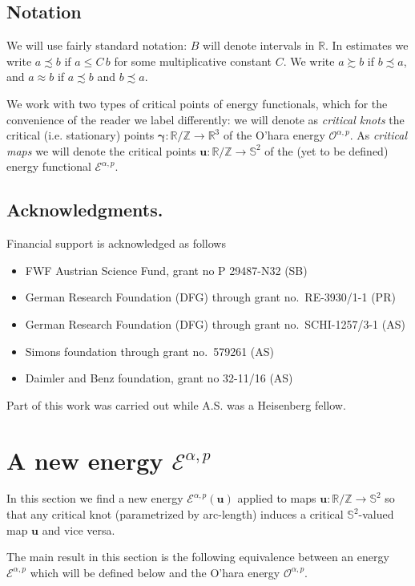 \documentclass[a4paper,10pt,intlimits,ngerman]{amsart}
\newcommand{\iv}{B} %
\numberwithin{equation}{section}
\newcommand{\R}{\mathbb{R}}
\newcommand{\Z}{\mathbb{Z}}
\renewcommand{\S}{\mathbb{S}}
\newcommand{\sol}{{\boldsymbol{\gamma}}}
\newcommand{\solu}{{\boldsymbol{u}}}
\newcommand{\aleq}{\precsim}
\newcommand{\ageq}{\succsim}
\newcommand{\aeq}{\approx}
\begin{document}
\subsection*{Notation}
We will use fairly standard notation: $\iv$ will denote intervals in $\R$. 
In estimates we write $a \aleq b$ if $a \leq C\, b$ for some multiplicative constant $C$. We write $a \ageq b$ if $b\aleq a$, and $a \aeq b$ if $a \aleq b$ and $b \aleq a$.

We work with two types of critical points of energy functionals, which for the convenience of the reader we label differently: we will denote as \emph{critical knots} the critical (i.e. stationary) points $\sol: \R / \Z \to \R^3$ of the O'hara energy $\mathcal{O}^{\alpha,p}$. As \emph{critical maps} we will denote the critical points $\solu: \R / \Z \to \S^2$ of the (yet to be defined) energy functional $\mathcal{E}^{\alpha,p}$.


\subsection*{Acknowledgments.}

Financial support is acknowledged as follows
\begin{itemize}
\item FWF Austrian Science Fund, grant no P 29487-N32 (SB)
\item German Research Foundation (DFG) through grant no.~RE-3930/1-1 (PR)
\item German Research Foundation (DFG) through grant no.~SCHI-1257/3-1 (AS)
\item Simons foundation through grant no.~579261 (AS)
\item Daimler and Benz foundation, grant no 32-11/16 (AS) 
\end{itemize}
Part of this work was carried out while A.S. was a Heisenberg fellow.

\section{A new energy \texorpdfstring{$\mathcal{E}^{\alpha,p}$}{E}}
In this section we find a new energy $\mathcal{E}^{\alpha,p}(\solu)$ applied to maps $\solu: \R/\Z \to \S^2$ so that any critical knot (parametrized by arc-length) induces a critical $\S^2$-valued map $\solu$ and vice versa. 

The main result in this section is the following equivalence between an energy $\mathcal{E}^{\alpha,p}$ which will be defined below and the O'hara energy $\mathcal{O}^{\alpha,p}$.
\end{document}
